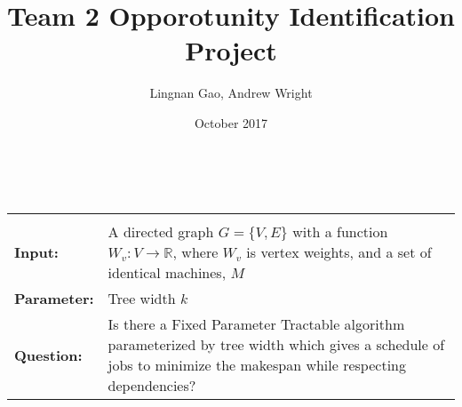 \documentclass{article}
\title{Team 2 Opporotunity Identification Project}
\author{Lingnan Gao, Andrew Wright}
\date{October 2017}
\begin{document}
\maketitle

\newcommand{\defproblem}[4]{%
  \hfill\\\smallskip\noindent%
  \begin{tabularx}{\textwidth}{|l X|}%
    \hline%
    \multicolumn{2}{|l|}{\pname{#1}}\\%
    \textbf{Input:}&#2\\%
    \textbf{Parameter:}&#3\\%
    \textbf{Question:}&#4\smallskip\\\hline%
  \end{tabularx}%
  \smallskip%
}%

\defproblem{Minimal Makespan}%
{A directed graph $G = \{V, E\}$ with a function $W_v: V \to \mathbb{R}$,
 where $W_v$ is vertex weights, and a set of identical machines,
$M$}%
{Tree width $k$}%
{Is there a Fixed Parameter Tractable algorithm parameterized by tree width
which gives a schedule of jobs to minimize the makespan while respecting
dependencies?}%
\end{document}
